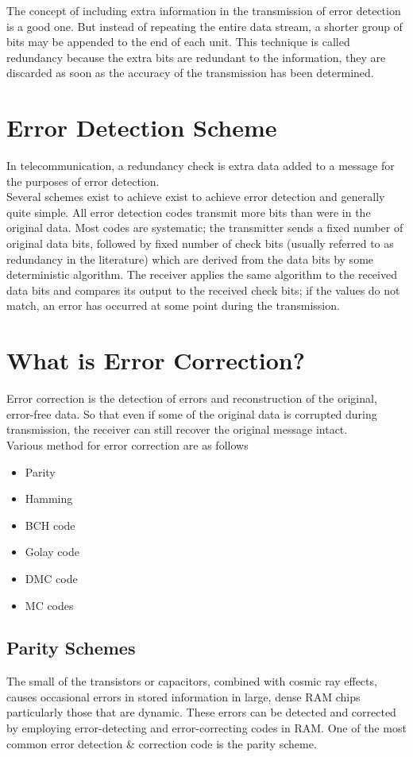\documentclass[12pt,a4paper]{report}
\begin{document}
 The concept of including extra information in the transmission of error detection is a good one. But instead of repeating the entire data stream, a shorter group of bits may be appended to the end of each unit. This technique is called redundancy because the extra bits are redundant to the information, they are discarded as soon as the accuracy of the transmission has been determined.
 
 \section{Error Detection Scheme}
 In telecommunication, a redundancy check is extra data added to a message for the purposes of error detection.\\
 
 Several schemes exist to achieve exist to achieve error detection and generally quite simple. All error detection codes transmit more bits than were in the original data. Most codes are systematic; the transmitter sends a fixed number of original data bits, followed by fixed number of check bits (usually referred to as redundancy in the literature) which are derived from the data bits by some deterministic algorithm. The receiver applies the same algorithm to the received data bits and compares its output to the received check bits; if the values do not match, an error has occurred at some point during the transmission.
 
 \section{What is Error Correction?}
 Error correction is the detection of errors and reconstruction of the original, error-free data. So that even if some of the original data is corrupted during transmission, the receiver can still recover the original message intact.\\
 
 Various method for error correction are as follows
 \begin{itemize}
 \item Parity
 \item Hamming
 \item BCH code
 \item Golay code
 \item DMC code
 \item MC codes
 \end{itemize}
 
 \subsection{Parity Schemes}
  The small of the transistors or capacitors, combined with cosmic ray effects, causes occasional errors in stored information in large, dense RAM chips particularly those that are dynamic. These errors can be detected and corrected by employing error-detecting and error-correcting codes in RAM. One of the most common error detection \& correction code is the parity scheme.\\
  
\end{document}
